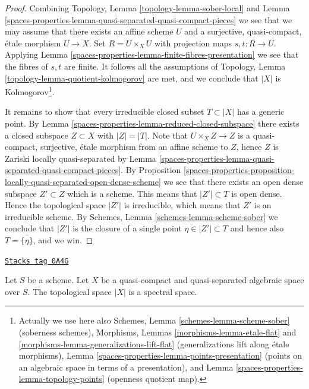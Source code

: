 \begin{proof}
Combining
Topology, Lemma \ref{topology-lemma-sober-local}
and
Lemma \ref{spaces-properties-lemma-quasi-separated-quasi-compact-pieces}
we see that we may assume that there exists an affine scheme $U$
and a surjective, quasi-compact, \'etale morphism $U \to X$.
Set $R = U \times_X U$ with projection maps $s, t : R \to U$. Applying
Lemma \ref{spaces-properties-lemma-finite-fibres-presentation}
we see that the fibres of $s, t$ are finite. It follows all the assumptions of
Topology, Lemma \ref{topology-lemma-quotient-kolmogorov}
are met, and we conclude that $|X|$ is Kolmogorov\footnote{
Actually we use here also
Schemes, Lemma \ref{schemes-lemma-scheme-sober} (soberness schemes),
Morphisms, Lemmas \ref{morphisms-lemma-etale-flat}
and \ref{morphisms-lemma-generalizations-lift-flat} (generalizations
lift along \'etale morphisms),
Lemma \ref{spaces-properties-lemma-points-presentation} (points on an algebraic space in
terms of a presentation), and
Lemma \ref{spaces-properties-lemma-topology-points} (openness quotient map).}.

\medskip\noindent
It remains to show that every irreducible closed subset
$T \subset |X|$ has a generic point. By
Lemma \ref{spaces-properties-lemma-reduced-closed-subspace}
there exists a closed subspace $Z \subset X$ with $|Z| = |T|$.
Note that $U \times_X Z \to Z$ is a quasi-compact, surjective, \'etale
morphism from an affine scheme to $Z$, hence $Z$ is Zariski locally
quasi-separated by
Lemma \ref{spaces-properties-lemma-quasi-separated-quasi-compact-pieces}.
By
Proposition \ref{spaces-properties-proposition-locally-quasi-separated-open-dense-scheme}
we see that there exists an open dense subspace $Z' \subset Z$
which is a scheme. This means that $|Z'| \subset T$ is open dense.
Hence the topological space $|Z'|$ is irreducible, which means that
$Z'$ is an irreducible scheme. By
Schemes, Lemma \ref{schemes-lemma-scheme-sober}
we conclude that $|Z'|$ is the closure of a single point
$\eta \in |Z'| \subset T$ and hence also $T = \overline{\{\eta\}}$, and we win.
\end{proof}

\begin{lemma}
\label{spaces-properties-lemma-quasi-compact-quasi-separated-spectral}
\href{https://stacks.math.columbia.edu/tag/0A4G}{\texttt{Stacks tag 0A4G}}

Let $S$ be a scheme. Let $X$ be a quasi-compact and quasi-separated
algebraic space over $S$. The topological space $|X|$ is a spectral space.
\end{lemma}


